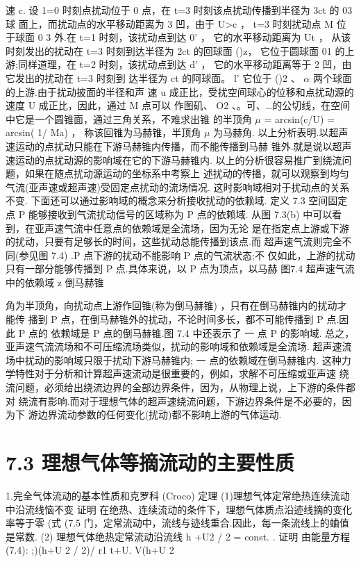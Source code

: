 速 c. 设 1=0 时刻点扰动位于 0 点，在 t=3 时刻该点扰动传播到半径为 3ct 的 03 球 面上，而扰动点的水平移动距离为 3 凹，由于 U>c ， t=3 时刻扰动点 M 位于球面 0 3 外.在 t=1 时刻，该扰动点到达 0' ， 它的水平移动距离为 Ut ， 从该时刻发出的扰动在 t=3 时刻到达半径为 2ct 的回球面 ()z， 它位于圆球面 01 的上游;同样道理，在 t=2 时刻，该扰动点到达 d' ， 它的水平移动距离等于 2 凹，由它发出的扰动在 t=3 时刻到 达半径为 ct 的阿球面。 l' 它位于 ()2 、 $\alpha$ 两个球面的上游.由于扰动披面的半径和声 速 u 成正比，受扰空间球心的位移和点扰动源的速度 U 成正比，因此，通过 M 点可以 作图矶、 O2 、。可、…的公切线，在空间中它是一个圆锥面，通过三角关系，不难求出锥 的半顶角 $\mu$ = arcsin(c/U) = arcsin( 1/ Ma) ， 称该回锥为马赫锥，半顶角 $\mu$ 为马赫角. 以上分析表明.以超声速运动的点扰动只能在下游马赫锥内传播，而不能传播到马赫 锥外.就是说以超声速运动的点扰动源的影响域在它的下游马赫锥内. 以上的分析很容易推广到绕流问题，如果在随点扰动源运动的坐标系中考察上 述扰动的传播，就可以观察到均匀气流(亚声速或超声速)受固定点扰动的流场情况. 这时影响域相对于扰动点的关系不变. 下面还可以通过影响域的概念来分析接收扰动的依赖域. 定义 7.3 空间固定点 P 能够接收到气流扰动信号的区域称为 P 点的依赖域. 从图 7.3(b) 中可以看到，在亚声速气流中任意点的依赖域是全流场，因为无论 是在指定点上游或下游的扰动，只要有足够长的时间，这些扰动总能传播到该点.而 超声速气流则完全不同(参见图 7.4) .P 点下游的扰动不能影响 P 点的气流状态;不 仅如此，上游的扰动只有一部分能够传播到 P 点.具体来说，以 P 点为顶点，以马赫 图7.4 超声速气流中的依赖域 z 倒马赫锥

角为半顶角，向扰动点上游作回锥(称为倒马赫锥) ，只有在倒马赫锥内的扰动才能传 播到 P 点，在倒马赫锥外的扰动，不论时间多长，都不可能传播到 P 点.因此 P 点的 依赖域是 P 点的倒马赫锥.图 7.4 中还表示了 一 点 P 的影响域. 总之，亚声速气流流场和不可压缩流场类似，扰动的影响域和依赖域是全流场. 超声速流场中扰动的影响域只限于扰动下游马赫锥内; 一 点的依赖域在倒马赫锥内. 这种力学特性对于分析和计算超声速流动是很重要的，例如，求解不可压缩或亚声速 绕流问题，必须给出绕流边界的全部边界条件，因为，从物理上说，上下游的条件都对 绕流有影响.而对于理想气体的超声速绕流问题，下游边界条件是不必要的，因为下 游边界流动参数的任何变化(扰动)都不影响上游的气体运动.

\section*{7.3  理想气体等摘流动的主要性质}

1.完全气体流动的基本性质和克罗科 (Croco) 定理 (1)理想气体定常绝热连续流动中沿流线恼不变 证明 在绝热、连续流动的条件下，理想气体质点沿迹线摘的变化率等于零 (式 (7.5 门，定常流动中，流线与迹线重合.因此，每一条流线上的蛐值是常数. (2) 理想气体绝热定常流动沿流线 h +U2 / 2 = const. . 证明 由能量方程 (7.4): ;)(h+U 2 / 2)/ r1 t+U. V(h+U 2

